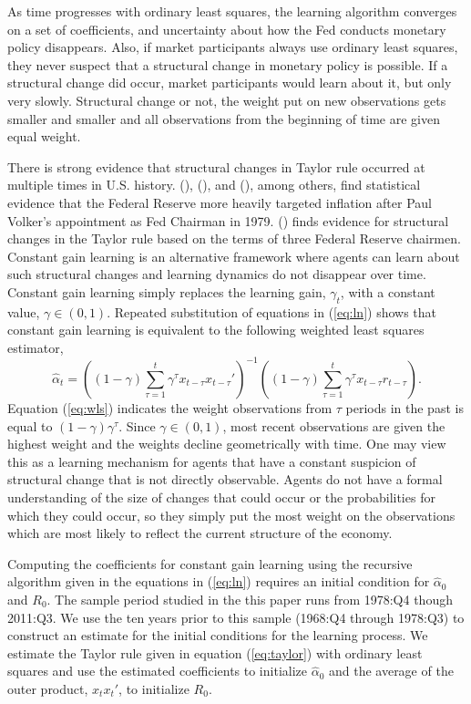 \documentclass[12pt]{article}
\newcommand{\beq}{\begin{equation}}
\newcommand{\eeq}{\end{equation}}
\newcommand{\citee}[1]{\citeauthor{#1} (\citeyear{#1})}
\begin{document}
As time progresses with ordinary least squares, the learning algorithm converges on a set of coefficients, and uncertainty about how the Fed conducts monetary policy disappears.  Also, if market participants always use ordinary least squares, they never suspect that a structural change in monetary policy is possible.  If a structural change did occur, market participants would learn about it, but only very slowly.  Structural change or not, the weight put on new observations gets smaller and smaller and all observations from the beginning of time are given equal weight.  

There is strong evidence that structural changes in Taylor rule occurred at multiple times in U.S. history.  \citee{taylor1999}, \citee{cgg2000}, and \citee{orphanides2003}, among others, find statistical evidence that the Federal Reserve more heavily targeted inflation after Paul Volker's appointment as Fed Chairman in 1979.  \citee{juddrude} finds evidence for structural changes in the Taylor rule based on the terms of three Federal Reserve chairmen.  Constant gain learning is an alternative framework where agents can learn about such structural changes and learning dynamics do not disappear over time.  Constant gain learning simply replaces the learning gain, $\gamma_t$, with a constant value, $\gamma \in (0,1)$.  Repeated substitution of equations in (\ref{eq:ln}) shows that constant gain learning is equivalent to the following weighted least squares estimator,
\beq \label{eq:wls} \hat{\alpha}_t = \left( (1-\gamma)  \sum_{\tau=1}^{t} \gamma^{\tau} x_{t-\tau} x_{t-\tau}' \right)^{-1}  \left( (1-\gamma)  \sum_{\tau=1}^{t} \gamma^{\tau} x_{t-\tau}  r_{t-\tau} \right). \eeq
Equation (\ref{eq:wls}) indicates the weight observations from $\tau$ periods in the past is equal to $(1-\gamma)\gamma^{\tau}$.  Since $\gamma \in (0,1)$, most recent observations are given the highest weight and the weights decline geometrically with time.  One may view this as a learning mechanism for agents that have a constant suspicion of structural change that is not directly observable.  Agents do not have a formal understanding of the size of changes that could occur or the probabilities for which they could occur, so they simply put the most weight on the observations which are most likely to reflect the current structure of the economy.

Computing the coefficients for constant gain learning using the recursive algorithm given in the equations in (\ref{eq:ln}) requires an initial condition for $\hat{\alpha}_0$ and $R_0$.  The sample period studied in the this paper runs from 1978:Q4 though 2011:Q3.  We use the ten years prior to this sample (1968:Q4 through 1978:Q3) to construct an estimate for the initial conditions for the learning process.  We estimate the Taylor rule given in equation (\ref{eq:taylor}) with ordinary least squares and use the estimated coefficients to initialize $\hat{\alpha}_0$ and the average of the outer product, $x_t x_t'$, to initialize $R_0$.
\end{document}
